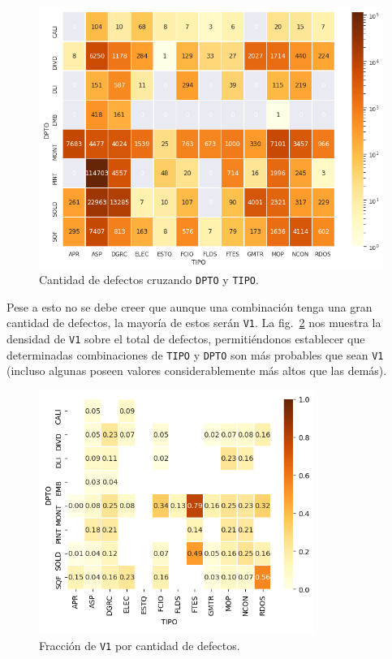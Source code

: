 \documentclass[a4paper,12pt]{article}
\begin{document}
		\begin{figure}[H]
			\begin{center}
				\includegraphics[width=1\textwidth]{tesis_56.png}
				\caption{Cantidad de defectos cruzando \texttt{DPTO} y \texttt{TIPO}.}
				\label{fig:heatmapdptotype}
			\end{center}
		\end{figure}
		
		\clearpage
		
		Pese a esto no se debe creer que aunque una combinación tenga una gran cantidad de defectos, la mayoría de estos serán \texttt{V1}. La fig.~\ref{fig:heatmapfractionv1} nos muestra la densidad de \texttt{V1} sobre el total de defectos, permitiéndonos establecer que determinadas combinaciones de \texttt{TIPO} y \texttt{DPTO} son más probables que sean \texttt{V1} (incluso algunas poseen valores considerablemente más altos que las demás).
		
		\begin{figure}[H]
			\begin{center}
				\includegraphics[width=0.8\textwidth]{tesis_58.png}
				\caption{Fracción de \texttt{V1} por cantidad de defectos.}
				\label{fig:heatmapfractionv1}
			\end{center}
		\end{figure}
		
\end{document}
